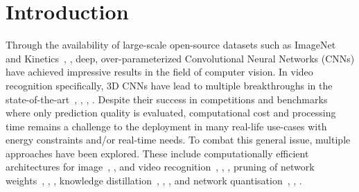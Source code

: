 \section{Introduction} \label{sec:introduction}



Through the availability of large-scale open-source datasets such as ImageNet~\cite{russakovsky2015imagenet} and Kinetics~\cite{kay2017kinetics}, \cite{carreira2018kinetics},
deep, over-parameterized Convolutional Neural Networks (CNNs) have achieved impressive results in the field of computer vision.
In video recognition specifically, 3D CNNs have lead to multiple breakthroughs in the state-of-the-art~\cite{carreira2017quo}, \cite{tran2018closer}, \cite{feichtenhofer2019slowfast}, \cite{feichtenhofer2020x3d}. %
Despite their success in competitions and benchmarks where only prediction quality is evaluated, computational cost and processing time remains a challenge to the deployment in many real-life use-cases with energy constraints and/or real-time needs.
To combat this general issue, multiple approaches have been explored.
These include computationally efficient architectures for image~\cite{howard2017mobilenet}, \cite{zhang2018shufflenet}, \cite{mingxing2019efficientnet} 
and video recognition~\cite{kopulku2019resource}, \cite{feichtenhofer2020x3d}, \cite{zhu2020faster},
pruning of network weights~\cite{chen2015compressing}, \cite{han2015deep}, \cite{he2017channel},
knowledge distillation~\cite{hinton2015distilling}, \cite{yim2017gift}, \cite{passalis2018learning},
and 
network quantisation~\cite{hubara2016binarized}, \cite{cai2017quantisation}, \cite{floropoulos2019complete}.

